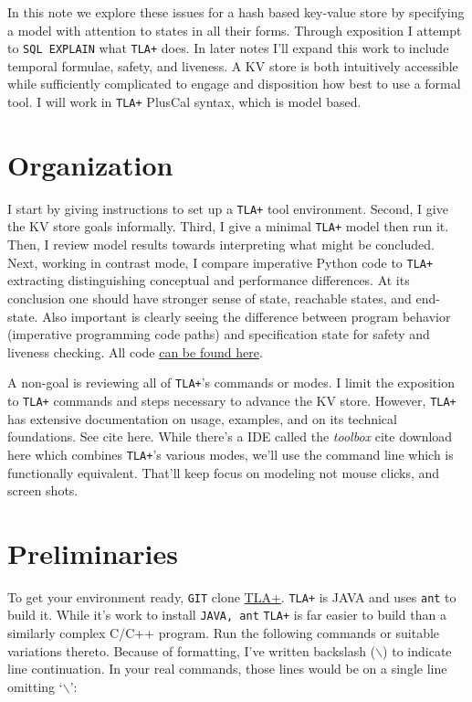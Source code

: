 \documentclass[twocolumn]{article}
\begin{document}
In this note we explore these issues for a hash based key-value store by specifying a model with attention to states in all their forms. Through exposition I attempt to \texttt{SQL EXPLAIN} what \texttt{TLA+} does. In later notes I'll expand this work to include temporal formulae, safety, and liveness. A KV store is both intuitively accessible while sufficiently complicated to engage and disposition how best to use a formal tool. I will work in \texttt{TLA+} PlusCal syntax, which is model based. 

\section{Organization}
I start by giving instructions to set up a \texttt{TLA+} tool environment. Second, I give the KV store goals informally. Third, I give a minimal \texttt{TLA+} model then run it. Then, I review model results towards interpreting what might be concluded. Next, working in contrast mode, I compare imperative Python code to \texttt{TLA+} extracting distinguishing conceptual and performance differences. At its conclusion one should have stronger sense of state, reachable states, and end-state. Also important is clearly seeing the difference between program behavior (imperative programming code paths) and specification state for safety and liveness checking. All code \href{https://github.com/rodgarrison/tla\_note1.git}{can be found here}.

A non-goal is reviewing all of \texttt{TLA+}'s commands or modes. I limit the exposition to \texttt{TLA+} commands and steps necessary to advance the KV store. However, \texttt{TLA+} has extensive documentation on usage, examples, and on its technical foundations. See cite here. While there's a IDE called the \emph{toolbox} cite download here which combines \texttt{TLA+}'s various modes, we'll use the command line which is functionally equivalent. That'll keep focus on modeling not mouse clicks, and screen shots.
 
\section{Preliminaries}
To get your environment ready, \texttt{GIT} clone \href{https://github.com/tlaplus/tlaplus.git}{TLA+}. \texttt{TLA+} is JAVA and uses \texttt{ant} to build it. While it's work to install \texttt{JAVA, ant} \texttt{TLA+} is far easier to build than a similarly complex C/C++ program. Run the following commands or suitable variations thereto. Because of formatting, I've written backslash ($\backslash$) to indicate line continuation. In your real commands, those lines would be on a single line omitting `$\backslash$':
\end{document}
